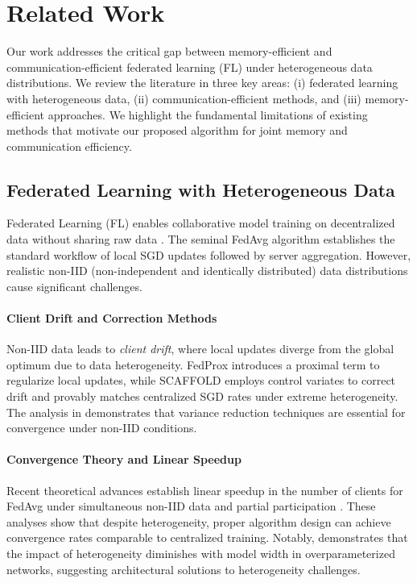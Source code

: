 \section{Related Work}
\label{sec:related}

Our work addresses the critical gap between memory-efficient and communication-efficient federated learning (FL) under heterogeneous data distributions. We review the literature in three key areas: (i) federated learning with heterogeneous data, (ii) communication-efficient methods, and (iii) memory-efficient approaches. We highlight the fundamental limitations of existing methods that motivate our proposed algorithm for joint memory and communication efficiency.

\subsection{Federated Learning with Heterogeneous Data}

Federated Learning (FL) enables collaborative model training on decentralized data without sharing raw data \cite{mcmahan2016communication}. The seminal FedAvg algorithm \cite{mcmahan2017fedavg} establishes the standard workflow of local SGD updates followed by server aggregation. However, realistic non-IID (non-independent and identically distributed) data distributions cause significant challenges.

\paragraph{Client Drift and Correction Methods}
Non-IID data leads to \textit{client drift}, where local updates diverge from the global optimum due to data heterogeneity. FedProx \cite{li2020fedprox} introduces a proximal term to regularize local updates, while SCAFFOLD \cite{karimireddy2020scaffold} employs control variates to correct drift and provably matches centralized SGD rates under extreme heterogeneity. The analysis in \cite{karimireddy2020scaffold} demonstrates that variance reduction techniques are essential for convergence under non-IID conditions.

\paragraph{Convergence Theory and Linear Speedup}
Recent theoretical advances establish linear speedup in the number of clients for FedAvg under simultaneous non-IID data and partial participation \cite{li2019fedavg, yang2021fedavg, qu2020fedavg}. These analyses show that despite heterogeneity, proper algorithm design can achieve convergence rates comparable to centralized training. Notably, \cite{jian2025heterogeneity} demonstrates that the impact of heterogeneity diminishes with model width in overparameterized networks, suggesting architectural solutions to heterogeneity challenges.

